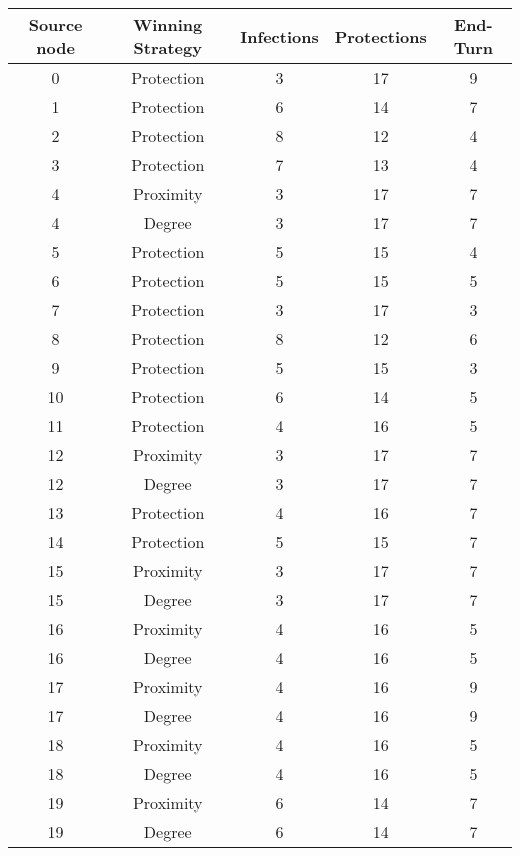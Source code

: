 \documentclass[results.tex]{subfiles}
\begin{document}
\begin{center}
  \begin{tabular}{| c || c | c | c | c |}
    \hline
    {\bfseries Source node} & {\bfseries Winning Strategy} & {\bfseries Infections} & {\bfseries Protections} & {\bfseries End-Turn} \\  %
    \hline\hline
    0 & Protection & 3 & 17 & 9 \\
    \hline
    1 & Protection & 6 & 14 & 7 \\
    \hline
    2 & Protection & 8 & 12 & 4 \\
    \hline
    3 & Protection & 7 & 13 & 4 \\
    \hline
    4 & Proximity & 3 & 17 & 7 \\
    \hline
    4 & Degree & 3 & 17 & 7 \\
    \hline
    5 & Protection & 5 & 15 & 4 \\
    \hline
    6 & Protection & 5 & 15 & 5\\
    \hline
    7 & Protection & 3 & 17 & 3 \\
    \hline
    8 & Protection & 8 & 12 & 6 \\
    \hline
    9 & Protection & 5 & 15 & 3 \\
    \hline
    10 & Protection & 6 & 14 & 5 \\
    \hline
    11 & Protection & 4 & 16 & 5 \\
    \hline
    12 & Proximity & 3 & 17 & 7 \\
    \hline
    12 & Degree & 3 & 17 & 7 \\
    \hline
    13 & Protection & 4 & 16 & 7 \\
    \hline
    14 & Protection & 5 & 15 & 7 \\
    \hline
    15 & Proximity & 3 & 17 & 7 \\
    \hline
    15 & Degree & 3 & 17 & 7 \\
    \hline
    16 & Proximity & 4 & 16 & 5 \\
    \hline
    16 & Degree & 4 & 16 & 5 \\
    \hline
    17 & Proximity & 4 & 16 & 9 \\
    \hline
    17 & Degree & 4 & 16 & 9 \\
    \hline
    18 & Proximity & 4 & 16 & 5 \\
    \hline
    18 & Degree & 4 & 16 & 5 \\
    \hline
    19 & Proximity & 6 & 14 & 7 \\
    \hline
    19 & Degree & 6 & 14 & 7 \\
    \hline
  \end{tabular}
\end{center}
\end{document}
